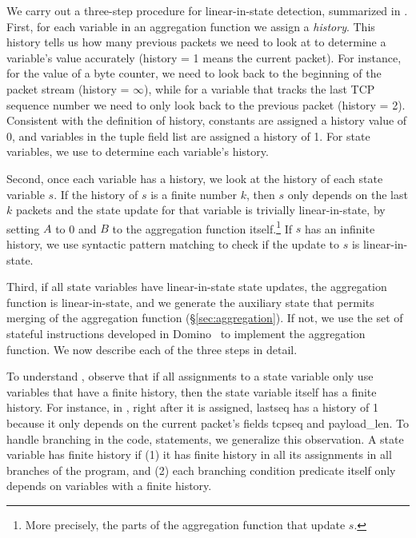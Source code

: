 
We carry out a three-step procedure for linear-in-state
detection, summarized in .  First, for each variable in an
aggregation function we assign a {\em history}.  This history tells us how many
previous packets we need to look at to determine a variable's value accurately
(history = 1 means the current packet). For instance, for the value of a byte
counter, we need to look back to the beginning of the packet stream (history =
$\infty$), while for a variable that tracks the last TCP sequence number
we need to only look back to the previous packet (history = 2). Consistent with
the definition of history, constants are assigned a history value of 0, and
variables in the tuple field list are assigned a history of 1. For state
variables, we use  to determine each variable's history.

Second, once each variable has a history, we look at the history of each state
variable $s$. If the history of $s$ is a finite number $k$, then $s$ only
depends on the last $k$ packets and the state update for that variable is
trivially linear-in-state, by setting $A$ to 0 and $B$ to the aggregation
function itself.\footnote{More precisely, the parts of the aggregation function
that update $s$.} If $s$ has an infinite history, we use syntactic pattern
matching to check if the update to $s$ is linear-in-state.

Third, if all state variables have linear-in-state state updates, the
aggregation function is linear-in-state, and we generate the auxiliary state
that permits merging of the aggregation function (\S\ref{sec:aggregation}). If
not, we use the set of stateful instructions developed in Domino~\cite{domino_sigcomm}
to implement the aggregation function. We now describe each of the three steps
in detail.

 To understand , observe that if all
assignments to a state variable only use variables that have a finite history,
then the state variable itself has a finite history. For instance, in
, right after it is assigned, {\ct lastseq} has a history of 1 because it only
depends on the current packet's fields {\ct tcpseq} and {\ct payload\_len}. To
handle branching in the code,  statements, we
generalize this observation. A state variable has finite history if  (1) it 
has finite history in all its assignments in all branches of the program,
and (2) each branching condition {\ct predicate} itself only depends on
variables with a finite history.

